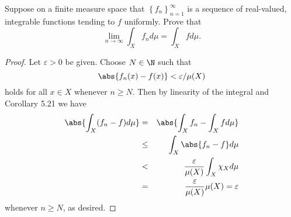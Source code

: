 \documentclass[12pt]{amsart}
\begin{document}
\setcounter{thm}{9}

\begin{thm}
  Suppose on a finite measure space that $\left\{f_n\right\}_{n = 1}^\infty$ is a sequence of real-valued, integrable functions tending to $f$ uniformly.
  Prove that 
  $$\lim_{n \rightarrow \infty} \int_X f_n d\mu = \int_X f d\mu.$$

  \begin{proof}
    Let $\varepsilon > 0$ be given.
    Choose $N \in \N$ such that 
    $$\abs{f_n(x) - f(x)} < \varepsilon/\mu(X)$$
    holds for all $x \in X$ whenever $n \geq N$.
    Then by linearity of the integral and Corollary 5.21 we have
    \begin{eqnarray*}
      \abs{\int_X (f_n - f) d\mu} & = & \abs{\int_X f_n - \int_X f d\mu}\\
      & \leq & \int_X \abs{f_n - f} d\mu\\
      & < & \frac{\varepsilon}{\mu(X)} \int_X \chi_X d\mu\\
      & = & \frac{\varepsilon}{\mu(X)} \mu(X) = \varepsilon
    \end{eqnarray*}
    whenever $n \geq N$, as desired.
  \end{proof}
\end{thm}
\newpage

\setcounter{thm}{16}
\end{document}

